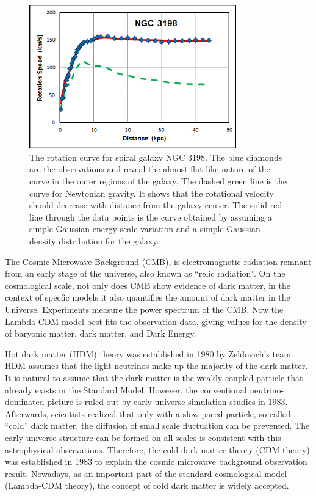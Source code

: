 \begin{figure}[htbp]
  \begin{center}
    \includegraphics[width=0.8\textwidth]{chapters/c2/figures/ngc3198_sparc.jpg}
  \end{center}
  \caption{The rotation curve for spiral galaxy NGC 3198. The blue diamonds are the observations and reveal the almost flat-like nature of the curve in the outer regions of the galaxy. The dashed green line is the curve for Newtonian gravity. It shows that the rotational velocity should decrease with distance from the galaxy center. The solid red line through the data points is the curve obtained by assuming a simple Gaussian energy scale variation and a simple Gaussian density distribution for the galaxy.}
  \label{fig:rotation}
\end{figure}

\par The Cosmic Microwave Background (CMB), is electromagnetic radiation remnant from an early stage of the universe, also known as ``relic radiation''. On the cosmological scale, not only does CMB show evidence of dark matter, in the context of specfic models it also quantifies the amount of dark matter in the Universe. Experiments measure the power spectrum of the CMB. Now the Lambda-CDM model best fits the observation data, giving values for the density of baryonic matter, dark matter, and Dark Energy.

\par Hot dark matter (HDM) theory\cite{Zeldovich:1982zz} was established in 1980 by Zeldovich's team. HDM assumes that the light neutrinos make up the majority of the dark matter. It is natural to assume that the dark matter is the weakly coupled particle that already exists in the Standard Model. However, the conventional neutrino-dominated picture is ruled out by early universe simulation studies in 1983\cite{White:1984yj}. Afterwards, scientists realized that only with a slow-paced particle, so-called ``cold'' dark matter, the diffusion of small scale fluctuation can be prevented. The early universe structure can be formed on all scales is consistent with this astrophysical observations. Therefore, the cold dark matter theory (CDM theory)\cite{PhysRevLett.48.223} was established in 1983 to explain the cosmic microwave background observation result. Nowadays, as an important part of the standard cosmological model (Lambda-CDM theory), the concept of cold dark matter is widely accepted. 

